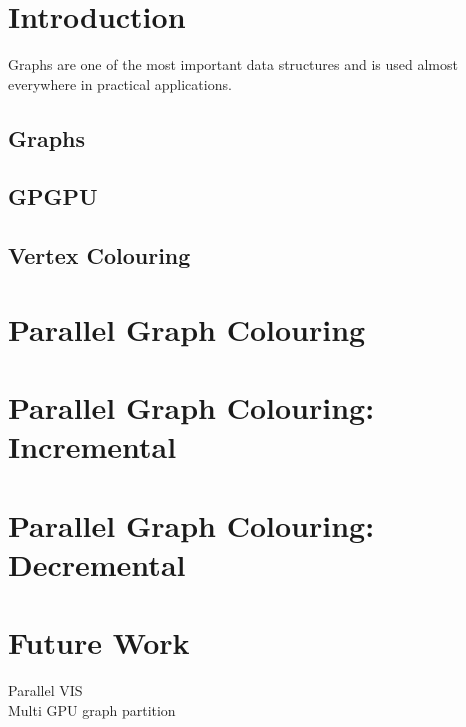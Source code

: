 \documentclass[MTech]{iitmdiss}
\begin{document}
\chapter{Introduction}
Graphs are one of the most important data structures and is used almost everywhere in practical applications.
\section{Graphs}
\section{GPGPU}
\section{Vertex Colouring}
\chapter{Parallel Graph Colouring}
\chapter{Parallel Graph Colouring: Incremental}
\chapter{Parallel Graph Colouring: Decremental}

\chapter{Future Work}
Parallel VIS\\
Multi GPU graph partition\\


%
\pagebreak
\begin{singlespace}
  \begin{small}
	
  \end{small}
\end{singlespace}

\end{document}

